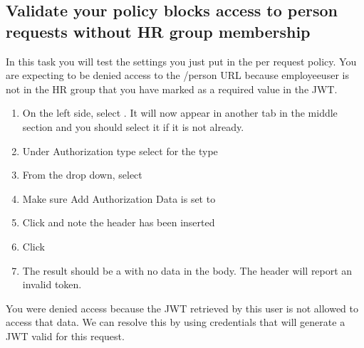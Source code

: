 \documentclass[letterpaper,10pt,english]{sphinxmanual}
\begin{document}
\subsection{Validate your policy blocks access to person requests without HR group membership}
\label{\detokenize{class1/module3/module3:validate-your-policy-blocks-access-to-person-requests-without-hr-group-membership}}
In this task you will test the settings you just put in the per request
policy. You are expecting to be denied access to the /person URL because
employeeuser is not in the HR group that you have marked as a required
value in the JWT.
\begin{enumerate}
\item {} 
On the left side, select . It will now appear
in another tab in the middle section and you should select it if it
is not already.

\item {} 
Under Authorization type select  for the type

\item {} 
From the  drop down, select 

\item {} 
Make sure Add Authorization Data is set to 

\item {} 
Click  and note the header has been inserted

\end{enumerate}
\begin{quote}

\noindent{}
\end{quote}
\begin{enumerate}
\setcounter{enumi}{5}
\item {} 
Click 

\item {} 
The result should be a  with no data in the body.
The header will report an invalid token.

\end{enumerate}
\begin{quote}

\noindent{}
\end{quote}

You were denied access because the JWT retrieved by this user is not
allowed to access that data. We can resolve this by using credentials
that will generate a JWT valid for this request.
\end{document}
